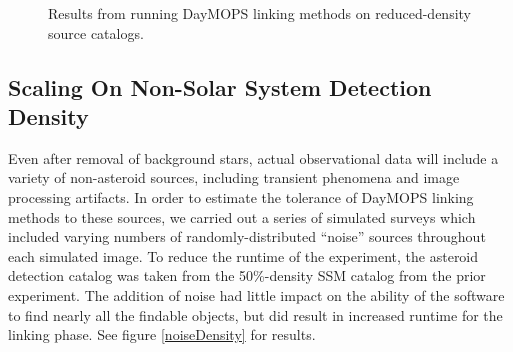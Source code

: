 \documentclass[12pt,preprint]{aastex}
\begin{document}
\begin{figure}


\caption{ Results from running DayMOPS linking methods on reduced-density source catalogs. }

\label{ssmDensity}

\end{figure}














\subsection{Scaling On Non-Solar System Detection Density}

Even after removal of background stars, actual observational data will
include a variety of non-asteroid sources, including transient
phenomena and image processing artifacts.  In order to estimate the
tolerance of DayMOPS linking methods to these sources, we carried out
a series of simulated surveys which included varying numbers of
randomly-distributed ``noise'' sources throughout each simulated
image.  To reduce the runtime of the experiment, the asteroid
detection catalog was taken from the 50\%-density SSM catalog from the
prior experiment.  The addition of noise had little impact on the
ability of the software to find nearly all the findable objects, but
did result in increased runtime for the linking phase.  See figure
\ref{noiseDensity} for results.
\end{document}
